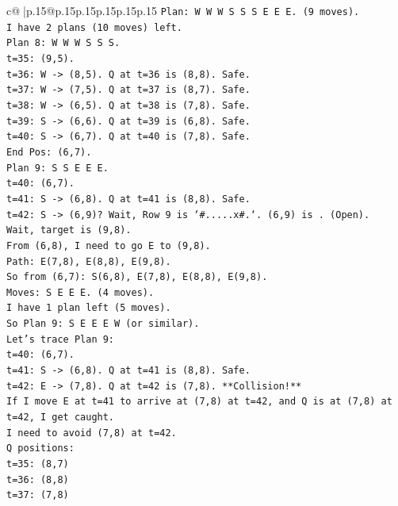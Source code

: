 \documentclass{article}
\begin{document}
{\begin{supertabular}{c@{$\;$}|p{.15\linewidth}@{}p{.15\linewidth}p{.15\linewidth}p{.15\linewidth}p{.15\linewidth}p{.15\linewidth}}
{{{\texttt{Plan: W W W S S S E E E. (9 moves).} \\
\texttt{I have 2 plans (10 moves) left.} \\
\texttt{Plan 8: W W W S S S.} \\
\texttt{t=35: (9,5).} \\
\texttt{t=36: W {-}> (8,5). Q at t=36 is (8,8). Safe.} \\
\texttt{t=37: W {-}> (7,5). Q at t=37 is (8,7). Safe.} \\
\texttt{t=38: W {-}> (6,5). Q at t=38 is (7,8). Safe.} \\
\texttt{t=39: S {-}> (6,6). Q at t=39 is (6,8). Safe.} \\
\texttt{t=40: S {-}> (6,7). Q at t=40 is (7,8). Safe.} \\
\texttt{End Pos: (6,7).} \\
\texttt{Plan 9: S S E E E.} \\
\texttt{t=40: (6,7).} \\
\texttt{t=41: S {-}> (6,8). Q at t=41 is (8,8). Safe.} \\
\texttt{t=42: S {-}> (6,9)? Wait, Row 9 is `\#.....x\#.`. (6,9) is . (Open).} \\
\texttt{Wait, target is (9,8).} \\
\texttt{From (6,8), I need to go E to (9,8).} \\
\texttt{Path: E(7,8), E(8,8), E(9,8).} \\
\texttt{So from (6,7): S(6,8), E(7,8), E(8,8), E(9,8).} \\
\texttt{Moves: S E E E. (4 moves).} \\
\texttt{I have 1 plan left (5 moves).} \\
\texttt{So Plan 9: S E E E W (or similar).} \\
\texttt{Let's trace Plan 9:} \\
\texttt{t=40: (6,7).} \\
\texttt{t=41: S {-}> (6,8). Q at t=41 is (8,8). Safe.} \\
\texttt{t=42: E {-}> (7,8). Q at t=42 is (7,8). **Collision!**} \\
\texttt{If I move E at t=41 to arrive at (7,8) at t=42, and Q is at (7,8) at t=42, I get caught.} \\
\texttt{I need to avoid (7,8) at t=42.} \\
\texttt{Q positions:} \\
\texttt{t=35: (8,7)} \\
\texttt{t=36: (8,8)} \\
\texttt{t=37: (7,8)} \\
}}}
\end{supertabular}}
\end{document}
